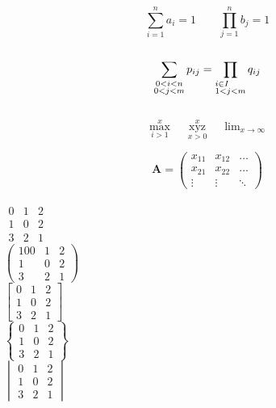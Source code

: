\documentclass[]{article}
\begin{document}
	
	
	\[
		\sum_{i=1}^{n} a_i = 1 \qquad	\prod_{j=1}^{n} b_j = 1
	\] \\
	
	\[
		\sum_{\substack{0<i<n \\ 0<j<m}} p_{ij} = \prod_{\begin{subarray} {l}i \in I \\ 1<j<m\end{subarray} } q_{ij}
	\] \\
	
	\[
		\max\limits_{i>1}^{x} \quad \mathop{xyz}\limits_{x>0}^{x} \quad \lim\nolimits_{x\to\infty}
	\]
	
	
	\[
		\mathbf{A} =
		\left(
			\begin{array}{ccc}
				x_{11} & x_{12} & \ldots \\
				x_{21} & x_{22} & \ldots \\
				\vdots & \vdots & \ddots
			\end{array}
			\right
		)
	\] \\
	
	\centering $\begin{matrix} 0 & 1 & 2 \\ 1 & 0 & 2 \\ 3 & 2 & 1\end{matrix} 	$ \\
	
	\centering $\begin{pmatrix} 100 & 1 & 2 \\ 1 & 0 & 2 \\ 3 & 2 & 1\end{pmatrix} 	$ \\
	
	\centering $\begin{bmatrix} 0 & 1 & 2 \\ 1 & 0 & 2 \\ 3 & 2 & 1\end{bmatrix} 	$ \\
	
	\centering $\begin{Bmatrix} 0 & 1 & 2 \\ 1 & 0 & 2 \\ 3 & 2 & 1\end{Bmatrix} 	$ \\
	
	\centering $\begin{vmatrix} 0 & 1 & 2 \\ 1 & 0 & 2 \\ 3 & 2 & 1\end{vmatrix} 	$ \\
	
\end{document}
